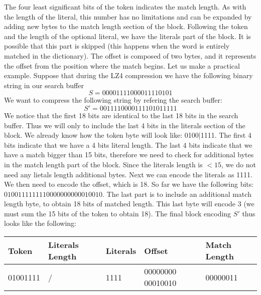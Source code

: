 The four least significant bits of the token indicates the match length. As with the
length of the literal, this number has no limitations and can be expanded by adding new
bytes to the match length section of the block.
Following the token and the length of the optional literal, we have the literals part of
the block. It is possible that this part is skipped (this happens when the word is
entirely matched in the dictionary).
The offset is composed of two bytes, and it represents the offset from the position where
the match begins.
Let us make a practical example. Suppose that during the LZ4 compression we have the following
binary string in our search buffer
$$S = 00001111000011110101$$
We want to compress the following string by refering the search buffer:
$$S' = 0011110000111101011111$$
We notice that the first 18 bits are identical to the last 18 bits in the search buffer. Thus
we will only to include the last 4 bits in the literals section of the block.
We already know how the token byte will look like: 0100$|$1111. The first 4 bits indicate that
we have a 4 bits literal length. The last 4 bits indicate that we have a match bigger than
15 bits, therefore we need to check for additional bytes in the match length part of the block.
Since the literals length is $< 15$, we do not need any lietals length additional bytes.
Next we can encode the literals as 1111. We then need to encode the offset, which is 18.
So far we have the following bits: $01001111 1111 00000000 00010010$.
The last part is to include an additional match length byte, to obtain 18 bits of matched
length. This last byte will encode 3 (we must sum the 15 bits of the token to obtain 18).
The final block encoding $S'$ thus looks like the following:
\begin{table}[!htbp]
\centering
\begin{tabular}{l|l|l|l|l}
\textbf{Token} & \textbf{Literals Length} & \textbf{Literals} & \textbf{Offset} & \textbf{Match Length} \\ 
\hline
01001111 & / & 1111 & 00000000 00010010 & 00000011 \\
\end{tabular}
\end{table}

